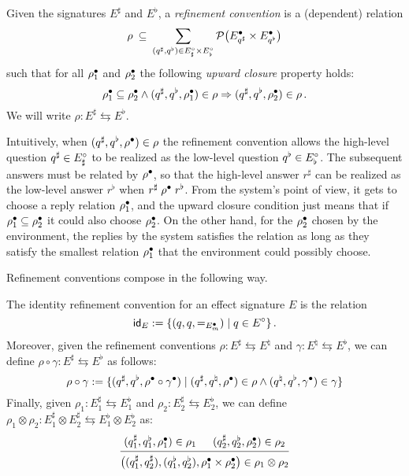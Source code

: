 \documentclass[acmsmall,review,anonymous]{acmart}\settopmatter{printfolios=true,printccs=false,printacmref=false}
\begin{document}
\begin{definition}
Given the signatures $E^\sharp$ and $E^\flat$,
a \emph{refinement convention} is a (dependent) relation
\[
  \rho \:\subseteq\:
  \sum_{(q^\sharp, q^\flat) \in E_\sharp^\circ \times E_\flat^\circ}
  \mathcal{P} \big( E_{q^\sharp}^\bullet \times E_{q^\flat}^\bullet \big)
\]
such that for all $\rho^\bullet_1$ and $\rho^\bullet_2$
the following \emph{upward closure} property holds:
\[
  \rho^\bullet_1 \subseteq \rho^\bullet_2
  \wedge
  (q^\sharp, q^\flat, \rho^\bullet_1) \in \rho
  \Rightarrow
  (q^\sharp, q^\flat, \rho^\bullet_2) \in \rho
  \,.
\]
We will write $\rho : E^\sharp \leftrightarrows E^\flat$.
\end{definition}

Intuitively,
when $(q^\sharp, q^\flat, \rho^\bullet) \in \rho$
the refinement convention allows
the high-level question $q^\sharp \in E^\circ_\sharp$ to be realized as
the low-level question $q^\flat \in E^\circ_\flat$.
The subsequent answers must be related by $\rho^\bullet$, so that
the high-level answer $r^\sharp$ %
can be realized as
the low-level answer $r^\flat$ %
when $r^\sharp \mathrel{\rho^\bullet} r^\flat$.
From the system's point of view,
it gets to choose a reply relation $\rho^\bullet_1$,
and the upward closure condition just means
that if $\rho^\bullet_1 \subseteq \rho^\bullet_2$
it could also choose $\rho^\bullet_2$.
On the other hand,
for the $\rho^\bullet_2$ chosen by the environment,
the replies by the system
satisfies the relation
as long as they satisfy the smallest relation
$\rho^\bullet_1$ that the environment could possibly choose.

Refinement conventions compose in the following way.

\begin{definition} \label{def:rccomp}
The identity refinement convention
for an effect signature $E$
is the relation
\[
   \mathsf{id} _E := \{(q, q, {=}_{E^\bullet_m}) \mid q \in E^\circ\} \,.
\]
Moreover,
given the refinement conventions
$\rho : E^\sharp \leftrightarrows E^\natural$
and
$\gamma : E^\natural \leftrightarrows E^\flat$,
we can define
$\rho \circ \gamma : E^\sharp \leftrightarrows E^\flat$ as follows:
\[
  \rho \circ \gamma :=
    \{ (q^\sharp, q^\flat, \rho^\bullet \circ \gamma^\bullet) \mid
       (q^\sharp, q^\natural, \rho^\bullet) \in \rho \wedge
       (q^\natural, q^\flat, \gamma^\bullet) \in \gamma \}
\]
Finally, given
$\rho_1 : E^\sharp_1 \leftrightarrows E^\flat_1$ and
$\rho_2 : E^\sharp_2 \leftrightarrows E^\flat_2$,
we can define
$\rho_1 \otimes \rho_2 : E^\sharp_1 \otimes E^\sharp_2
\leftrightarrows E^\flat_1 \otimes E^\flat_2$
as:
\[
  \begin{prooftree}
    \hypo{(q^\sharp_1, q^\flat_1, \rho_1^\ans) \in \rho_1}
    \hypo{(q^\sharp_2, q^\flat_2, \rho_2^\ans) \in \rho_2}
    \infer2{
      \big( (q^\sharp_1, q^\sharp_2), (q^\flat_1, q^\flat_2),
      \rho_1^\ans \times \rho_2^\ans \big)
      \in \rho_1 \otimes \rho_2}
  \end{prooftree}
\]
\end{definition}
\end{document}
